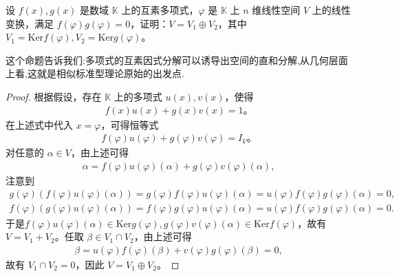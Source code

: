 \documentclass[../../main.tex]{subfiles}%
\begin{document}
\begin{proposition}\label{proposition:互素多项式诱导直和分解1}
设 $f(x), g(x)$ 是数域 $\mathbb{K}$ 上的互素多项式，$\varphi$ 是 $\mathbb{K}$ 上 $n$ 维线性空间 $V$ 上的线性变换，满足 $f(\varphi)g(\varphi) = 0$，证明：$V = V_1 \oplus V_2$，其中 $V_1 = \text{Ker} f(\varphi), V_2 = \text{Ker} g(\varphi)$。
\end{proposition}
\begin{remark}
这个命题告诉我们:多项式的互素因式分解可以诱导出空间的直和分解,从几何层面上看,这就是相似标准型理论原始的出发点.
\end{remark}
\begin{proof}
根据假设，存在 $\mathbb{K}$ 上的多项式 $u(x), v(x)$，使得
\begin{align*}
f(x)u(x) + g(x)v(x) = 1。
\end{align*}
在上述式中代入 $x = \varphi$，可得恒等式
\begin{align*}
f(\varphi)u(\varphi) + g(\varphi)v(\varphi) = I_V。
\end{align*}
对任意的 $\alpha \in V$，由上述可得
\begin{align*}
\alpha = f(\varphi)u(\varphi)(\alpha) + g(\varphi)v(\varphi)(\alpha),
\end{align*}
注意到 
\begin{align*}
g\left( \varphi \right) \left( f\left( \varphi \right) u\left( \varphi \right) \left( \alpha \right) \right) =g\left( \varphi \right) f\left( \varphi \right) u\left( \varphi \right) \left( \alpha \right) =u\left( \varphi \right) f\left( \varphi \right) g\left( \varphi \right) \left( \alpha \right) =0,
\\
f\left( \varphi \right) \left( g\left( \varphi \right) u\left( \varphi \right) \left( \alpha \right) \right) =f\left( \varphi \right) g\left( \varphi \right) u\left( \varphi \right) \left( \alpha \right) =u\left( \varphi \right) f\left( \varphi \right) g\left( \varphi \right) \left( \alpha \right) =0.
\end{align*}
于是$f(\varphi)u(\varphi)(\alpha) \in \text{Ker} g(\varphi), g(\varphi)v(\varphi)(\alpha) \in \text{Ker} f(\varphi)$，故有 $V = V_1 + V_2$。任取 $\beta \in V_1 \cap V_2$，由上述可得
\begin{align*}
\beta = u(\varphi)f(\varphi)(\beta) + v(\varphi)g(\varphi)(\beta) = 0,
\end{align*}
故有 $V_1 \cap V_2 = 0$，因此 $V = V_1 \oplus V_2$。     
\end{proof}
\end{document}
